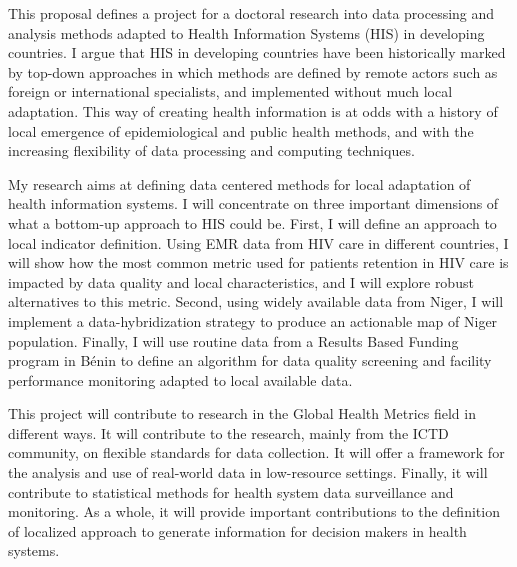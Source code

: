 \documentclass[a4paper,11pt,twoside]{article}
\begin{document}
This proposal defines a project for a doctoral research into data processing and analysis methods adapted to Health Information Systems (HIS) in developing countries. I argue that HIS in developing countries have been historically marked by top-down approaches in which methods are defined by remote actors such as foreign or international specialists, and implemented without much local adaptation. This way of creating health information is at odds with a history of local emergence of epidemiological and public health methods, and with the increasing flexibility of data processing and computing techniques.

My research aims at defining data centered methods for local adaptation of health information systems. I will concentrate on three important dimensions of what a bottom-up approach to HIS could be. First, I will define an approach to local indicator definition. Using EMR data from HIV care in different countries, I will show how the most common metric used for patients retention in HIV care is impacted by data quality and local characteristics, and I will explore robust alternatives to this metric. Second, using widely available data from Niger, I will implement a data-hybridization strategy to produce an actionable map of Niger population. Finally, I will use routine data from a Results Based Funding program in Bénin to define an algorithm for data quality screening and facility performance monitoring adapted to local available data.

This project will contribute to research in the Global Health Metrics field in different ways. It will contribute to the research, mainly from the ICTD community, on flexible standards for data collection. It will offer a framework for the analysis and use of real-world data in low-resource settings. Finally, it will contribute to statistical methods for health system data surveillance and monitoring. As a whole, it will provide important contributions to the definition of  localized approach to generate information for decision makers in health systems.

\cleardoublepage
\tableofcontents
{}
\newpage
{}
\listoffigures
\newpage

{}
\printglossaries
\thispagestyle{fancy}
\end{document}
